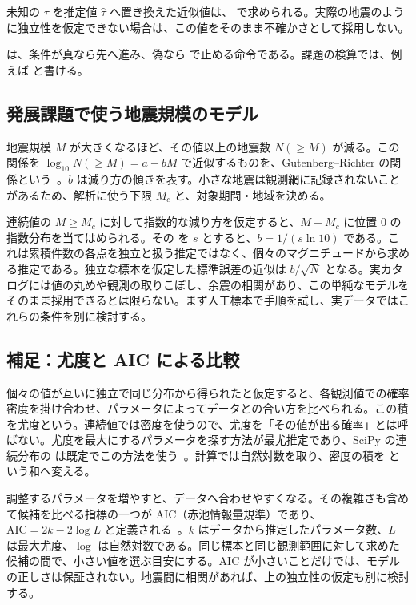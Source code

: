 未知の \(\tau\) を推定値 \(\hat{\tau}\) へ置き換えた近似値は、 で求められる。実際の地震のように独立性を仮定できない場合は、この値をそのまま不確かさとして採用しない。

 は、条件が真なら先へ進み、偽なら  で止める命令である。課題の検算では、例えば  と書ける。

\subsection{発展課題で使う地震規模のモデル}

地震規模 \(M\) が大きくなるほど、その値以上の地震数 \(N(\geq M)\) が減る。この関係を \(\log_{10}N(\geq M)=a-bM\) で近似するものを、Gutenberg--Richter の関係という~\cite{gutenberg_richter_1944}。\(b\) は減り方の傾きを表す。小さな地震は観測網に記録されないことがあるため、解析に使う下限 \(M_c\) と、対象期間・地域を決める。

連続値の \(M\geq M_c\) に対して指数的な減り方を仮定すると、\(M-M_c\) に位置 0 の指数分布を当てはめられる。その  を \(s\) とすると、\(b=1/(s\ln 10)\) である。これは累積件数の各点を独立と扱う推定ではなく、個々のマグニチュードから求める推定である。独立な標本を仮定した標準誤差の近似は \(b/\sqrt{N}\) となる。実カタログには値の丸めや観測の取りこぼし、余震の相関があり、この単純なモデルをそのまま採用できるとは限らない。まず人工標本で手順を試し、実データではこれらの条件を別に検討する。

\subsection{補足：尤度と AIC による比較}

個々の値が互いに独立で同じ分布から得られたと仮定すると、各観測値での確率密度を掛け合わせ、パラメータによってデータとの合い方を比べられる。この積を尤度という。連続値では密度を使うので、尤度を「その値が出る確率」とは呼ばない。尤度を最大にするパラメータを探す方法が最尤推定であり、SciPy の連続分布の  は既定でこの方法を使う~\cite{scipy_distribution_fit}。計算では自然対数を取り、密度の積を  という和へ変える。

調整するパラメータを増やすと、データへ合わせやすくなる。その複雑さも含めて候補を比べる指標の一つが AIC（赤池情報量規準）であり、\(\mathrm{AIC}=2k-2\log L\) と定義される~\cite{statsmodels_aic}。\(k\) はデータから推定したパラメータ数、\(L\) は最大尤度、\(\log\) は自然対数である。同じ標本と同じ観測範囲に対して求めた候補の間で、小さい値を選ぶ目安にする。AIC が小さいことだけでは、モデルの正しさは保証されない。地震間に相関があれば、上の独立性の仮定も別に検討する。

